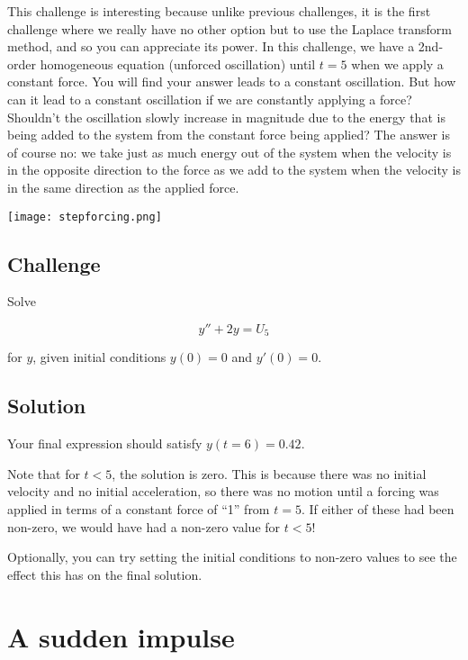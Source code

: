 This challenge is interesting because unlike previous challenges, it is the first challenge where we really have no other option but to use the Laplace transform method, and so you can appreciate its power. In this challenge, we have a 2nd-order homogeneous equation (unforced oscillation) until $t=5$ when we apply a constant force. You will find your answer leads to a constant oscillation. But how can it lead to a constant oscillation if we are constantly applying a force? Shouldn't the oscillation slowly increase in magnitude due to the energy that is being added to the system from the constant force being applied? The answer is of course no: we take just as much energy out of the system when the velocity is in the opposite direction to the force as we add to the system when the velocity is in the same direction as the applied force.

\texttt{[image: stepforcing.png]}

\subsection*{Challenge}
Solve

\begin{equation}
    y''+2y=U_5
\end{equation}

for $y$, given initial conditions $y(0)=0$ and $y'(0)=0$. 

\subsection*{Solution}
Your final expression should satisfy $y(t=6)=0.42$.

Note that for $t<5$, the solution is zero. This is because there was no initial velocity and no initial acceleration, so there was no motion until a forcing was applied in terms of a constant force of ``1'' from $t=5$. If either of these had been non-zero, we would have had a non-zero value for $t<5$!

Optionally, you can try setting the initial conditions to non-zero values to see the effect this has on the final solution.



\newpage
\section{A sudden impulse}

